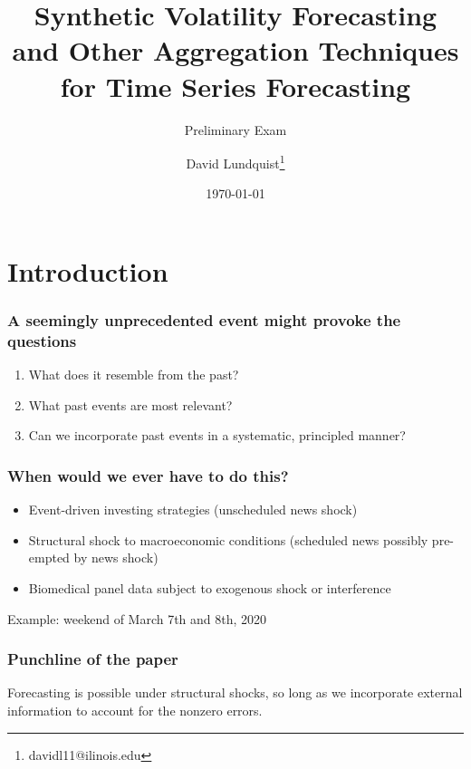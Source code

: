 \documentclass{beamer}
\title{Synthetic Volatility Forecasting and Other Aggregation Techniques for Time Series Forecasting}
\subtitle{Preliminary Exam}
\author{David Lundquist\thanks{davidl11@ilinois.edu}}
\date{\today}
\begin{document}
\begin{frame}
\titlepage
\end{frame}

\section{Introduction}

\begin{frame}
\frametitle{A seemingly unprecedented event might provoke the questions}
\begin{enumerate}
    \item What does it resemble from the past?
    \item What past events are most relevant?
    \item Can we incorporate past events in a systematic, principled manner? 
\end{enumerate}
\end{frame}

\begin{frame}
    \frametitle{When would we ever have to do this?}

    \begin{itemize}
        \item Event-driven investing strategies (unscheduled news shock) 
        \item Structural shock to macroeconomic conditions (scheduled news possibly pre-empted by news shock)
        \item Biomedical panel data subject to exogenous shock or interference
    \end{itemize}

Example: weekend of March 7th and 8th, 2020

\end{frame}

\begin{frame}
\frametitle{Punchline of the paper}

Forecasting is possible under structural shocks, so long as we incorporate external information to account for the nonzero errors.

\end{frame}
\end{document}
